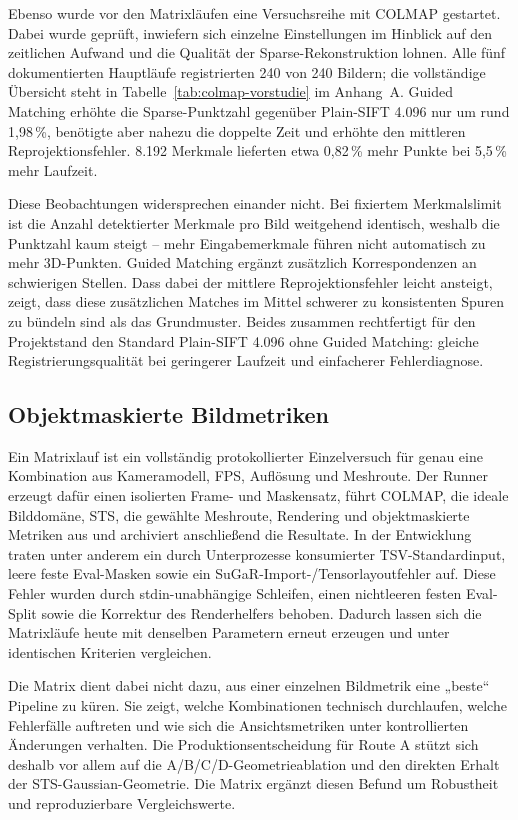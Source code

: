 Ebenso wurde vor den Matrixläufen eine Versuchsreihe mit COLMAP gestartet.
Dabei wurde geprüft, inwiefern sich einzelne Einstellungen im Hinblick auf den
zeitlichen Aufwand und die Qualität der Sparse-Rekonstruktion lohnen. Alle
fünf dokumentierten Hauptläufe registrierten 240 von 240 Bildern; die
vollständige Übersicht steht in Tabelle~\ref{tab:colmap-vorstudie} im Anhang~A. Guided
Matching erhöhte die Sparse-Punktzahl gegenüber Plain-SIFT 4.096 nur um rund
1,98\,\%, benötigte aber nahezu die doppelte Zeit und erhöhte den mittleren
Reprojektionsfehler. 8.192 Merkmale lieferten etwa 0,82\,\% mehr Punkte bei
5,5\,\% mehr Laufzeit.

Diese Beobachtungen widersprechen einander nicht. Bei fixiertem
Merkmalslimit ist die Anzahl detektierter Merkmale pro Bild weitgehend
identisch, weshalb die Punktzahl kaum steigt -- mehr Eingabemerkmale führen
nicht automatisch zu mehr 3D-Punkten. Guided Matching ergänzt zusätzlich
Korrespondenzen an schwierigen Stellen. Dass dabei der mittlere
Reprojektionsfehler leicht ansteigt, zeigt, dass diese zusätzlichen Matches
im Mittel schwerer zu konsistenten Spuren zu bündeln sind als das
Grundmuster. Beides zusammen rechtfertigt für den Projektstand den Standard
Plain-SIFT 4.096 ohne Guided Matching: gleiche Registrierungsqualität bei
geringerer Laufzeit und einfacherer Fehlerdiagnose.

\subsection{Objektmaskierte Bildmetriken}

Ein Matrixlauf ist ein vollständig protokollierter Einzelversuch für genau
eine Kombination aus Kameramodell, FPS, Auflösung und Meshroute. Der Runner
erzeugt dafür einen isolierten Frame- und Maskensatz, führt COLMAP, die ideale
Bilddomäne, STS, die gewählte Meshroute, Rendering und objektmaskierte
Metriken aus und archiviert anschließend die Resultate. In der Entwicklung
traten unter anderem ein durch Unterprozesse konsumierter TSV-Standardinput,
leere feste Eval-Masken sowie ein SuGaR-Import-/Tensorlayoutfehler auf. Diese
Fehler wurden durch stdin-unabhängige Schleifen, einen nichtleeren festen
Eval-Split sowie die Korrektur des Renderhelfers behoben. Dadurch lassen sich
die Matrixläufe heute mit denselben Parametern erneut erzeugen und unter
identischen Kriterien vergleichen.

Die Matrix dient dabei nicht dazu, aus einer einzelnen Bildmetrik eine
„beste“ Pipeline zu küren. Sie zeigt, welche Kombinationen technisch
durchlaufen, welche Fehlerfälle auftreten und wie sich die Ansichtsmetriken
unter kontrollierten Änderungen verhalten. Die Produktionsentscheidung für
Route A stützt sich deshalb vor allem auf die A/B/C/D-Geometrieablation und
den direkten Erhalt der STS-Gaussian-Geometrie. Die Matrix ergänzt diesen
Befund um Robustheit und reproduzierbare Vergleichswerte.

